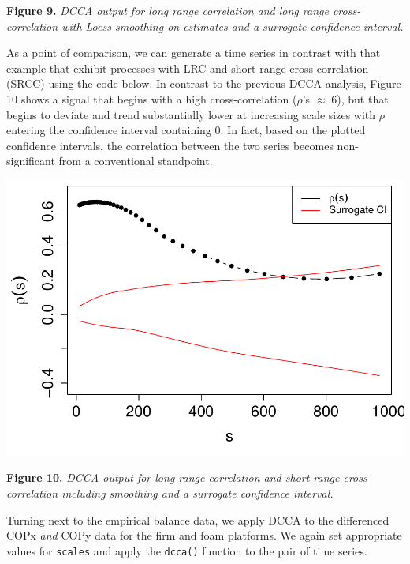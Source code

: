 \documentclass[
  man]{apa6}
\begin{document}
\textbf{Figure 9.} \emph{DCCA output for long range correlation and long range
cross-correlation with Loess smoothing on estimates and a surrogate
confidence interval.}

As a point of comparison, we can generate a time series in contrast with
that example that exhibit processes with LRC and short-range
cross-correlation (SRCC) using the code below. In contrast to the
previous DCCA analysis, Figure 10 shows a signal that begins with a high
cross-correlation (\(\rho\)'s \(\approx .6\)), but that begins to deviate
and trend substantially lower at increasing scale sizes with \(\rho\)
entering the confidence interval containing 0. In fact, based on the
plotted confidence intervals, the correlation between the two series
becomes non-significant from a conventional standpoint.

\includegraphics{fractal_regression_paper_brm_files/figure-latex/unnamed-chunk-20-1.pdf}

\textbf{Figure 10.} \emph{DCCA output for long range correlation and short range
cross-correlation including smoothing and a surrogate confidence
interval.}

Turning next to the empirical balance data, we apply DCCA to the
differenced COPx \emph{and} COPy data for the firm and foam platforms. We
again set appropriate values for \texttt{scales} and apply the \texttt{dcca()}
function to the pair of time series.
\end{document}
